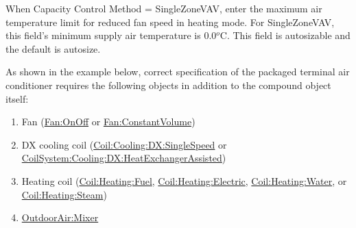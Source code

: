 When Capacity Control Method = SingleZoneVAV, enter the maximum air temperature limit for reduced fan speed in heating mode. For SingleZoneVAV, this field's minimum supply air temperature is 0.0\(^{o}\)C. This field is autosizable and the default is autosize.


As shown in the example below, correct specification of the packaged terminal air conditioner requires the following objects in addition to the compound object itself:

\begin{enumerate}
\def\labelenumi{\arabic{enumi})}
\item
  Fan (\hyperref[fanonoff]{Fan:OnOff} or \hyperref[fanconstantvolume]{Fan:ConstantVolume})
\item
  DX cooling coil (\hyperref[coilcoolingdxsinglespeed]{Coil:Cooling:DX:SingleSpeed} or \hyperref[coilsystemcoolingdxheatexchangerassisted]{CoilSystem:Cooling:DX:HeatExchangerAssisted})
\item
  Heating coil (\hyperref[coilheatinggas-000]{Coil:Heating:Fuel}, \hyperref[coilheatingelectric]{Coil:Heating:Electric}, \hyperref[coilheatingwater]{Coil:Heating:Water}, or \hyperref[coilheatingsteam]{Coil:Heating:Steam})
\item
  \hyperref[outdoorairmixer]{OutdoorAir:Mixer}
\end{enumerate}

